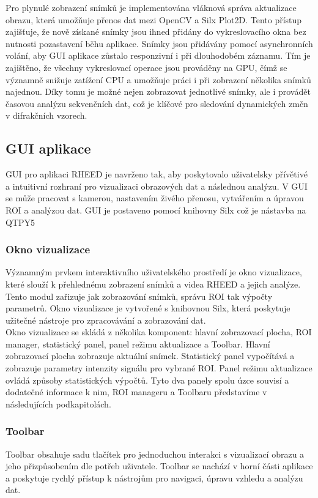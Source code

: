 \documentclass{article}
\begin{document}
Pro plynulé zobrazení snímků je implementována vláknová správa aktualizace obrazu, která umožňuje přenos dat mezi OpenCV a Silx Plot2D. Tento přístup zajišťuje, že nově získané snímky jsou ihned přidány do vykreslovacího okna bez nutnosti pozastavení běhu aplikace. Snímky jsou přidávány pomocí asynchronních volání, aby GUI aplikace zůstalo responzivní i při dlouhodobém záznamu. Tím je zajištěno, že všechny vykreslovací operace jsou prováděny na GPU, čímž se významně snižuje zatížení CPU a umožňuje práci i při zobrazení několika snímků najednou. Díky tomu je možné nejen zobrazovat jednotlivé snímky, ale i provádět časovou analýzu sekvenčních dat, což je klíčové pro sledování dynamických změn v difrakčních vzorech.\\

\subsection{GUI aplikace}
GUI pro aplikaci RHEED je navrženo tak, aby poskytovalo uživatelsky přívětivé a intuitivní rozhraní pro vizualizaci obrazových dat a následnou analýzu. V GUI se může pracovat s kamerou, nastavením živého přenosu, vytvářením a úpravou ROI a analýzou dat. GUI je postaveno pomocí knihovny Silx což je nástavba na QTPY5

\subsubsection{Okno vizualizace}
Významným prvkem interaktivního uživatelského prostředí je okno vizualizace, které slouží k přehlednému zobrazení snímků a videa RHEED a jejich analýze. Tento modul zařizuje jak zobrazování snímků, správu ROI tak výpočty parametrů. Okno vizualizace je vytvořené s knihovnou Silx, která poskytuje užitečné nástroje pro zpracovávání a zobrazování dat.\\

Okno vizualizace se skládá z několika komponent: hlavní zobrazovací plocha, ROI manager, statistický panel, panel režimu aktualizace a Toolbar. Hlavní zobrazovací plocha zobrazuje aktuální snímek. Statistický panel vypočítává a zobrazuje parametry intenzity signálu pro vybrané ROI. Panel režimu aktualizace ovládá způsoby statistických výpočtů. Tyto dva panely spolu úzce souvisí a dodatečné informace k nim, ROI manageru a Toolbaru představíme v následujících podkapitolách. 

\subsubsection{Toolbar}
Toolbar obsahuje sadu tlačítek pro jednoduchou interakci s vizualizací obrazu a jeho přizpůsobením dle potřeb uživatele. Toolbar se nachází v horní části aplikace a poskytuje rychlý přístup k nástrojům pro navigaci, úpravu vzhledu a analýzu dat.\\
\end{document}

